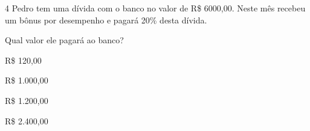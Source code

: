 \begin{escolha}
\begin{boxmedio}
\begin{boxmedio}
{\begin{boxpeq}
\begin{boxpeq}
{\begin{boxpeq}
\begin{boxmedio}
\begin{boxmedio}
\begin{boxpeq}
\begin{boxmedio}
\begin{boxpeq}
\begin{boxpeq}
\begin{boxpeq}
\begin{boxpeq}
\begin{boxmedio}
{\begin{boxmedio}
\begin{boxmedio}
\begin{boxpeq}
\begin{boxmedio}
\begin{boxpeq}
\begin{boxpeq}
\begin{boxpeq}
\begin{escolha}
{\begin{boxmedio}
\begin{boxpeq}
\begin{boxpeq}
\begin{boxpeq}
\begin{boxpeq}
\begin{boxpeq}
\begin{boxmedio}
\begin{boxpeq}
\begin{boxpeq}
\begin{boxpeq}
{\begin{boxpeq}
\begin{boxmedio}
\begin{boxpeq}
\begin{boxpeq}
\begin{boxpeq}
{\begin{boxpeq}
\begin{boxmedio}
{\begin{boxpeq}
\begin{boxpeq}
\begin{boxmedio}
\begin{boxmedio}
\begin{boxpeq}
\begin{boxpeq}
{\begin{boxpeq}
\begin{boxpeq}
\begin{boxpeq}
\begin{boxpeq}
\begin{boxpeq}
\begin{escolha}
\begin{escolha}
{\begin{boxmedio}
\begin{boxpeq}
\begin{q°}
\begin{boxmedio}
\begin{boxpeq}
\begin{boxpeq}
\begin{boxmedio}
\begin{boxmedio}
\begin{boxmedio}
\begin{boxmedio}
{\begin{enumerate}
\begin{boxpeq}
{\begin{boxpeq}
\begin{boxpeq}
\begin{boxmedio}
\begin{boxpeq}
\begin{boxpeq}
\begin{boxpeq}
\num{4} Pedro tem uma dívida com o banco no valor de R\$ 6000,00. Neste mês
recebeu um bônus por desempenho e pagará 20\% desta dívida.

Qual valor ele pagará ao banco?

\begin{escolha}

  \item R\$ 120,00

  \item R\$ 1.000,00

  \item R\$ 1.200,00

  \item R\$ 2.400,00

\end{escolha}

\end{boxpeq}
\end{boxpeq}
\end{boxpeq}
\end{boxmedio}
\end{boxpeq}
\end{boxpeq}}
\end{boxpeq}
\end{enumerate}}
\end{boxmedio}
\end{boxmedio}
\end{boxmedio}
\end{boxmedio}
\end{boxpeq}
\end{boxpeq}
\end{boxmedio}
\end{q°}
\end{boxpeq}
\end{boxmedio}}
\end{escolha}
\end{escolha}
\end{boxpeq}
\end{boxpeq}
\end{boxpeq}
\end{boxpeq}
\end{boxpeq}}
\end{boxpeq}
\end{boxpeq}
\end{boxmedio}
\end{boxmedio}
\end{boxpeq}
\end{boxpeq}}
\end{boxmedio}
\end{boxpeq}}
\end{boxpeq}
\end{boxpeq}
\end{boxpeq}
\end{boxmedio}
\end{boxpeq}}
\end{boxpeq}
\end{boxpeq}
\end{boxpeq}
\end{boxmedio}
\end{boxpeq}
\end{boxpeq}
\end{boxpeq}
\end{boxpeq}
\end{boxpeq}
\end{boxmedio}}
\end{escolha}
\end{boxpeq}
\end{boxpeq}
\end{boxpeq}
\end{boxmedio}
\end{boxpeq}
\end{boxmedio}
\end{boxmedio}}
\end{boxmedio}
\end{boxpeq}
\end{boxpeq}
\end{boxpeq}
\end{boxpeq}
\end{boxmedio}
\end{boxpeq}
\end{boxmedio}
\end{boxmedio}
\end{boxpeq}}
\end{boxpeq}
\end{boxpeq}}
\end{boxmedio}
\end{boxmedio}
\end{escolha}
